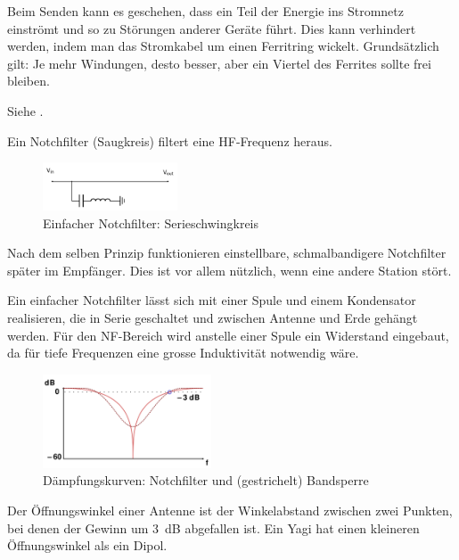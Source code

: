 {Beim Senden kann es geschehen, dass ein Teil der Energie ins Stromnetz einströmt und so zu Störungen anderer Geräte führt. Dies kann verhindert werden, indem man das Stromkabel um einen Ferritring wickelt. Grundsätzlich gilt: Je mehr Windungen, desto besser, aber ein Viertel des Ferrites sollte frei bleiben.}

{Siehe .}

{Ein Notchfilter (Saugkreis) filtert eine HF-Frequenz heraus.

\begin{figure}[h!]
 \centering
 \includegraphics[width=4cm]{./png/Amfu-Schema-Notchfilter.png}
 \caption{Einfacher Notchfilter: Serieschwingkreis}
 \label{fig:notchfilter}
\end{figure}

Nach dem selben Prinzip funktionieren einstellbare, schmalbandigere Notchfilter später im Empfänger. Dies ist vor allem nützlich, wenn eine andere Station stört.

Ein einfacher Notchfilter lässt sich mit einer Spule und einem Kondensator realisieren, die in Serie geschaltet und zwischen Antenne und Erde gehängt werden. Für den NF-Bereich wird anstelle einer Spule ein Widerstand eingebaut, da für tiefe Frequenzen eine grosse Induktivität notwendig wäre.

\begin{figure}[h!]
 \centering
 \includegraphics[width=5cm]{./png/Amfu-Notchfilter.png}
 \caption{Dämpfungskurven: Notchfilter und 
(gestrichelt) Bandsperre}
 \label{fig:notchfilterFreq}
\end{figure}
}

{Der Öffnungswinkel einer Antenne ist der Winkelabstand zwischen zwei Punkten, bei denen der Gewinn um 3 dB abgefallen ist. Ein Yagi hat einen kleineren Öffnungswinkel als ein Dipol.}


